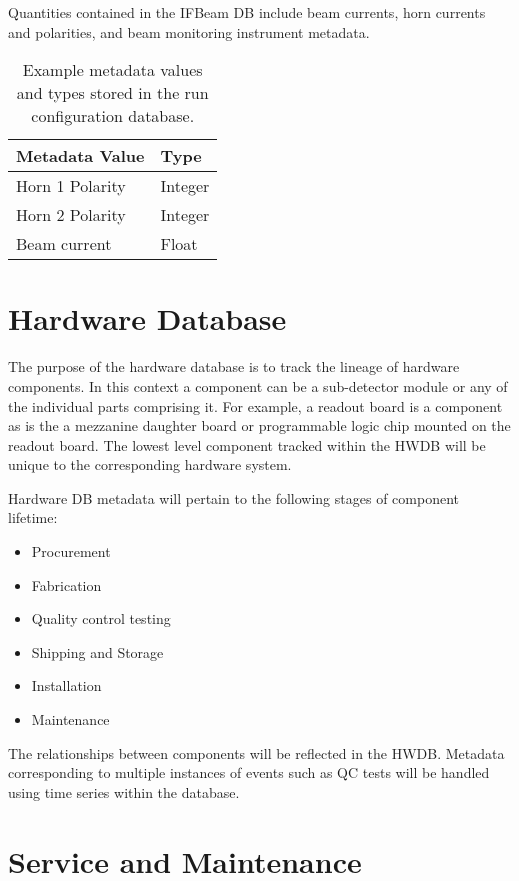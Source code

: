 Quantities contained in the IFBeam DB include beam currents, horn currents and polarities, and beam monitoring instrument metadata.

\begin{table}[h!]
\centering
 \begin{tabular}{||l| l ||} 
 \hline
 Metadata Value & Type  \\ [0.5ex] 
 \hline\hline
Horn 1 Polarity &  Integer \\ \hline
Horn 2 Polarity  & Integer  \\ \hline
Beam current & Float \\ [1ex] 
\hline
\end{tabular}
\caption{Example metadata values and types stored in the run configuration database.}
\label{table:ifbeam}
\end{table}

\section{Hardware Database}
\label{sec:db:hwdb}  

The purpose of the hardware database is to track the lineage of hardware components. In this context a component can be a sub-detector module or any of the individual parts comprising it. For example, a readout board is a component as is the a mezzanine daughter board or programmable logic chip mounted on the readout board. The lowest level component tracked within the HWDB will be unique to the corresponding hardware system.

Hardware DB metadata will pertain to the following stages of component lifetime:

\begin{itemize}
\item Procurement 
\item Fabrication
\item Quality control testing
\item Shipping and Storage
\item Installation
\item Maintenance 
\end{itemize}

The relationships between components will be reflected in the HWDB. Metadata corresponding to multiple instances of events such as QC tests will be handled using time series within the database. 

\section{Service and Maintenance}
\label{sec:db:service}  

